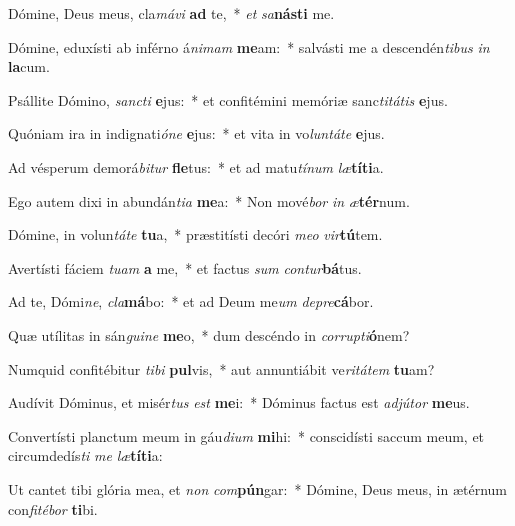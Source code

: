 \item Dómine, Deus meus, cla\textit{má}\textit{vi} \textbf{ad} te,~* \textit{et} \textit{sa}\textbf{nás}\textbf{ti} me.
\item Dómine, eduxísti ab inférno á\textit{ni}\textit{mam} \textbf{me}am:~* salvásti me a descendén\textit{ti}\textit{bus} \textit{in} \textbf{la}cum.
\item Psállite Dómino, \textit{sanc}\textit{ti} \textbf{e}jus:~* et confitémini memóriæ sanc\textit{ti}\textit{tá}\textit{tis} \textbf{e}jus.
\item Quóniam ira in indignati\textit{ó}\textit{ne} \textbf{e}jus:~* et vita in vo\textit{lun}\textit{tá}\textit{te} \textbf{e}jus.
\item Ad vésperum demorá\textit{bi}\textit{tur} \textbf{fle}tus:~* et ad matu\textit{tí}\textit{num} \textit{læ}\textbf{tí}\textbf{ti}a.
\item Ego autem dixi in abundán\textit{ti}\textit{a} \textbf{me}a:~* Non mové\textit{bor} \textit{in} \textit{æ}\textbf{tér}num.
\item Dómine, in volun\textit{tá}\textit{te} \textbf{tu}a,~* præstitísti decóri \textit{me}\textit{o} \textit{vir}\textbf{tú}tem.
\item Avertísti fáciem \textit{tu}\textit{am} \textbf{a} me,~* et factus \textit{sum} \textit{con}\textit{tur}\textbf{bá}tus.
\item Ad te, Dómi\textit{ne}, \textit{cla}\textbf{má}bo:~* et ad Deum me\textit{um} \textit{de}\textit{pre}\textbf{cá}bor.
\item Quæ utílitas in sán\textit{gui}\textit{ne} \textbf{me}o,~* dum descéndo in \textit{cor}\textit{rup}\textit{ti}\textbf{ó}nem?
\item Numquid confitébitur \textit{ti}\textit{bi} \textbf{pul}vis,~* aut annuntiábit ve\textit{ri}\textit{tá}\textit{tem} \textbf{tu}am?
\item Audívit Dóminus, et misér\textit{tus} \textit{est} \textbf{me}i:~* Dóminus factus est \textit{ad}\textit{jú}\textit{tor} \textbf{me}us.
\item Convertísti planctum meum in gáu\textit{di}\textit{um} \textbf{mi}hi:~* conscidísti saccum meum, et circumdedís\textit{ti} \textit{me} \textit{læ}\textbf{tí}\textbf{ti}a:
\item Ut cantet tibi glória mea, et \textit{non} \textit{com}\textbf{pún}gar:~* Dómine, Deus meus, in ætérnum con\textit{fi}\textit{té}\textit{bor} \textbf{ti}bi.
